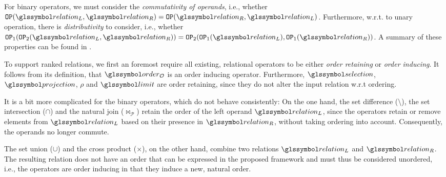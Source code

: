 For binary operators, we must consider the \emph{commutativity of operands}, i.e., whether $\mathtt{OP} (\relation_L, \relation_R) = \mathtt{OP}(\relation_R, \relation_L)$. Furthermore, w.r.t. to unary operation, there is \emph{distributivity} to consider, i.e., whether $\mathtt{OP}_{1} (\mathtt{OP}_{2} (\relation_L,  \relation_R)) = \mathtt{OP}_{2} ( \mathtt{OP}_{1} ( \relation_L), \mathtt{OP}_{1} ( \relation_R))$. A summary of these properties can be found in .

To support ranked relations, we first an foremost require all existing, relational operators to be either \emph{order retaining} or \emph{order inducing}. It follows from its definition, that $\order_{\mathcal{O}}$ is an order inducing operator. Furthermore, $\selection$, $\projection$, $\rho$ and $\limit$ are order retaining, since they do not alter the input relation w.r.t ordering.

It is a bit more complicated for the binary operators, which do not behave consistently: On the one hand, the set difference ($\setminus$), the set intersection ($\cap$) and the natural join ($\Join_{\mathcal{P}}$) retain the order of the left operand $\relation_L$, since the operators retain or remove elements from $\relation_L$ based on their presence in $\relation_R$, without taking ordering into account. Consequently, the operands no longer commute.

The set union ($\cup$) and the cross product ($\times$), on the other hand, combine two relations $\relation_L$ and $\relation_R$. The resulting relation does not have an order that can be expressed in the proposed framework and must thus be considered unordered, i.e., the operators are order inducing in that they induce a new, natural order.

